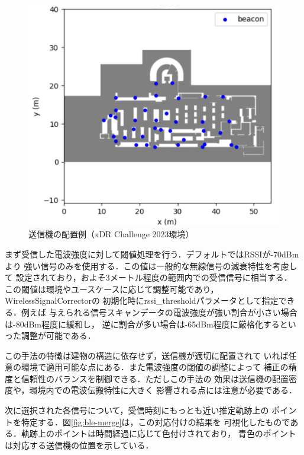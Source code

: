 \begin{figure}[H]
    \centering
    \includegraphics[width=\linewidth]{../image/ble-beacon-position.jpg}
    \caption{送信機の配置例（xDR Challenge 2023環境）}    \label{fig:ble-beacon-position}
\end{figure}


まず受信した電波強度に対して閾値処理を行う．デフォルトではRSSIが-70dBmより
強い信号のみを使用する．この値は一般的な無線信号の減衰特性を考慮して
設定されており，およそ3メートル程度の範囲内での受信信号に相当する．
この閾値は環境やユースケースに応じて調整可能であり，WirelessSignalCorrectorの
初期化時にrssi\_thresholdパラメータとして指定できる．例えば
与えられる信号スキャンデータの電波強度が強い割合が小さい場合は-80dBm程度に緩和し，
逆に割合が多い場合は-65dBm程度に厳格化するといった調整が可能である．


この手法の特徴は建物の構造に依存せず，送信機が適切に配置されて
いれば任意の環境で適用可能な点にある．また電波強度の閾値の調整によって
補正の精度と信頼性のバランスを制御できる．ただしこの手法の
効果は送信機の配置密度や，環境内での電波伝搬特性に大きく
影響される点には注意が必要である．

次に選択された各信号について，受信時刻にもっとも近い推定軌跡上の
ポイントを特定する．図\ref{fig:ble-merge}は，この対応付けの結果を
可視化したものである．軌跡上のポイントは時間経過に応じて色付けされており，
青色のポイントは対応する送信機の位置を示している．

